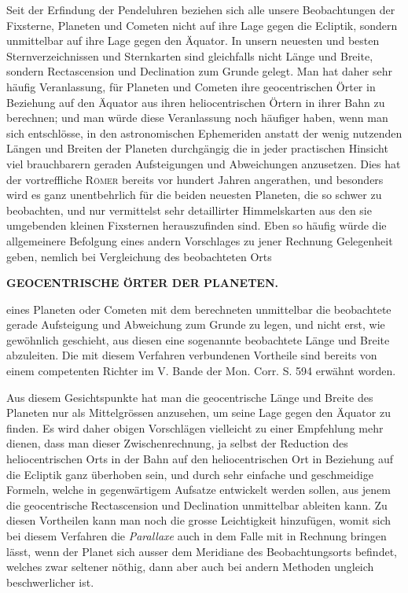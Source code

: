 Seit der Erfindung der Pendeluhren beziehen sich alle unsere Beobachtungen
der Fixsterne, Planeten und Cometen nicht auf ihre Lage gegen die Ecliptik,
sondern unmittelbar auf ihre Lage gegen den Äquator. In unsern neuesten
und besten Sternverzeichnissen und Sternkarten sind gleichfalls nicht Länge und
Breite, sondern Rectascension und Declination zum Grunde gelegt. Man hat
daher sehr häufig Veranlassung, für Planeten und Cometen ihre geocentrischen
Örter in Beziehung auf den Äquator aus ihren heliocentrischen Örtern in ihrer
Bahn zu berechnen; und man würde diese Veranlassung noch häufiger haben,
wenn man sich entschlösse, in den astronomischen Ephemeriden anstatt der wenig
nutzenden Längen und Breiten der Planeten durchgängig die in jeder practischen
Hinsicht viel brauchbarern geraden Aufsteigungen und Abweichungen anzusetzen.
Dies hat der vortreffliche \textsc{Römer} bereits vor hundert Jahren angerathen,
und besonders wird es ganz unentbehrlich für die beiden neuesten Planeten,
die so schwer zu beobachten, und nur vermittelst sehr detaillirter Himmelskarten
aus den sie umgebenden kleinen Fixsternen herauszufinden sind. Eben
so häufig würde die allgemeinere Befolgung eines andern Vorschlages zu jener
Rechnung Gelegenheit geben, nemlich bei Vergleichung des beobachteten Orts
\par
\clearpage
\thispagestyle{empty}
\noindent{}%
\makebox[12mm][l]{}%
\parbox[t]{\dimexpr\linewidth-24mm\relax}{\centering\footnotesize\bfseries GEOCENTRISCHE ÖRTER DER PLANETEN.\par}%
\par\nobreak\medskip
\begingroup\fontsize{10.65}{13.2}\selectfont
\noindent eines Planeten oder Cometen mit dem berechneten unmittelbar die beobachtete
gerade Aufsteigung und Abweichung zum Grunde zu legen, und nicht erst, wie
gewöhnlich geschieht, aus diesen eine sogenannte beobachtete Länge und Breite
abzuleiten. Die mit diesem Verfahren verbundenen Vortheile sind bereits von
einem competenten Richter im V. Bande der Mon. Corr. S. 594 erwähnt worden.

Aus diesem Gesichtspunkte hat man die geocentrische Länge und Breite
des Planeten nur als Mittelgrössen anzusehen, um seine Lage gegen den Äquator
zu finden. Es wird daher obigen Vorschlägen vielleicht zu einer Empfehlung
mehr dienen, dass man dieser Zwischenrechnung, ja selbst der Reduction des
heliocentrischen Orts in der Bahn auf den heliocentrischen Ort in Beziehung auf
die Ecliptik ganz überhoben sein, und durch sehr einfache und geschmeidige
Formeln, welche in gegenwärtigem Aufsatze entwickelt werden sollen, aus jenem
die geocentrische Rectascension und Declination unmittelbar ableiten kann. Zu
diesen Vortheilen kann man noch die grosse Leichtigkeit hinzufügen, womit sich
bei diesem Verfahren die \textit{Parallaxe} auch in dem Falle mit in Rechnung bringen
lässt, wenn der Planet sich ausser dem Meridiane des Beobachtungsorts befindet,
welches zwar seltener nöthig, dann aber auch bei andern Methoden ungleich beschwerlicher
ist.

